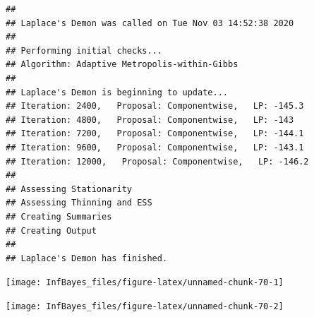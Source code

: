 \documentclass[
]{book}
\newenvironment{Shaded}{\begin{snugshade}}{\end{snugshade}}
\newcommand{\CommentTok}[1]{\textcolor[rgb]{0.56,0.35,0.01}{\textit{#1}}}
\newcommand{\DataTypeTok}[1]{\textcolor[rgb]{0.13,0.29,0.53}{#1}}
\newcommand{\DecValTok}[1]{\textcolor[rgb]{0.00,0.00,0.81}{#1}}
\newcommand{\KeywordTok}[1]{\textcolor[rgb]{0.13,0.29,0.53}{\textbf{#1}}}
\newcommand{\NormalTok}[1]{#1}
\newcommand{\OperatorTok}[1]{\textcolor[rgb]{0.81,0.36,0.00}{\textbf{#1}}}
\newcommand{\OtherTok}[1]{\textcolor[rgb]{0.56,0.35,0.01}{#1}}
\newcommand{\StringTok}[1]{\textcolor[rgb]{0.31,0.60,0.02}{#1}}
\begin{document}
\begin{verbatim}
## 
## Laplace's Demon was called on Tue Nov 03 14:52:38 2020
## 
## Performing initial checks...
## Algorithm: Adaptive Metropolis-within-Gibbs 
## 
## Laplace's Demon is beginning to update...
## Iteration: 2400,   Proposal: Componentwise,   LP: -145.3
## Iteration: 4800,   Proposal: Componentwise,   LP: -143
## Iteration: 7200,   Proposal: Componentwise,   LP: -144.1
## Iteration: 9600,   Proposal: Componentwise,   LP: -143.1
## Iteration: 12000,   Proposal: Componentwise,   LP: -146.2
## 
## Assessing Stationarity
## Assessing Thinning and ESS
## Creating Summaries
## Creating Output
## 
## Laplace's Demon has finished.
\end{verbatim}

\begin{Shaded}
\end{Shaded}

\begin{center}\texttt{[image: InfBayes\_files/figure-latex/unnamed-chunk-70-1]} \end{center}

\begin{center}\texttt{[image: InfBayes\_files/figure-latex/unnamed-chunk-70-2]} \end{center}
\end{document}
